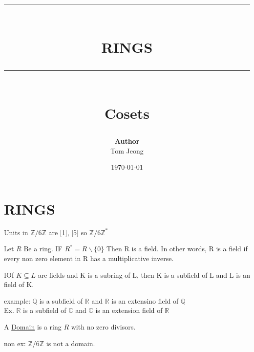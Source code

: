 \documentclass{article}
\newcommand{\HRule}[1]{\rule{\linewidth}{#1}}
\begin{document}

\title{ \normalsize \textsc{}
		\\ [2.0cm]
		\HRule{1.5pt} \\
		\LARGE \textbf{\uppercase{RINGS}}
		\HRule{2.0pt} \\ [0.6cm] \LARGE{Cosets}
		}

\date{\today}
\author{\textbf{Author} \\ 
		Tom Jeong
        }

\maketitle
\newpage

\tableofcontents
\newpage

\section{RINGS}
Units in $\mathbb{Z} / 6\mathbb{Z}$ are [1], [5] so $\mathbb{Z} / 6\mathbb{Z}^*$
\begin{definition}
    Let $R$ Be a ring. IF $R^* = R \backslash \{0\}$ Then R is a field. 
    In other words, R is a field if every non zero element in R has a multiplicative inverse.
\end{definition}

\begin{definition}
     IOf $K \subseteq L $ are fields and K is a subring of L, then K is a subfield of L and L is an  field of K. 
\end{definition}
example: $\mathbb{Q}$ is a subfield of $\mathbb{R}$ and $\mathbb{R}$ is an extensino field of $\mathbb{Q}$  \\ 
Ex. $\mathbb{R}$ is a subfield of $\mathbb{C}$ and $\mathbb{C}$ is an extension field of $\mathbb{R}$ 

\begin{definition}
    A \underline{Domain} is a ring $R$ with no zero divisors. 

\end{definition}
non ex: $\mathbb{Z} / 6 \mathbb{Z}$ is not a domain.
\end{document}
